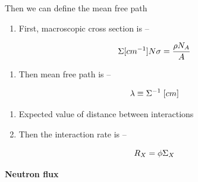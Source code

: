 \documentclass[aspectratio=1610,pdftex,dvipsnames,compress,xcolor={dvipsnames}]{beamer}
\begin{document}
\begin{frame}{Then we can define the mean free path}
    \begin{enumerate}[series=outerlist,topsep=0pt,itemsep=21pt,leftmargin=*,label=(\arabic*)]
        \item[]First, macroscopic cross section is --
    \end{enumerate}

    \vspace*{\fill}

    \begin{equation}
        \LARGE
        \Sigma [cm^{-1}] N \sigma = \frac{\rho N_A}{A}
    \end{equation}

    \vspace*{\fill}

    \begin{enumerate}[series=outerlist,topsep=0pt,itemsep=21pt,leftmargin=*,label=(\arabic*)]
        \item[]Then mean free path is --
    \end{enumerate}

    \vspace*{\fill}

    \begin{equation}
        \LARGE
        \lambda \equiv \Sigma^{-1} \; [cm]
    \end{equation}

    \vspace*{\fill}

    \begin{enumerate}[series=outerlist,topsep=0pt,itemsep=11pt,leftmargin=*,label=(\arabic*)]
        \item[]Expected value of distance between interactions
        \item[]Then the interaction rate is --
    \end{enumerate}

    \vspace*{\fill}

    \begin{equation}
        \LARGE
        R_X = \phi \Sigma_X
    \end{equation}

\end{frame}


\begin{frame}[plain]{}
    \centering\LARGE\textbf{Neutron flux}
\end{frame}
\end{document}

